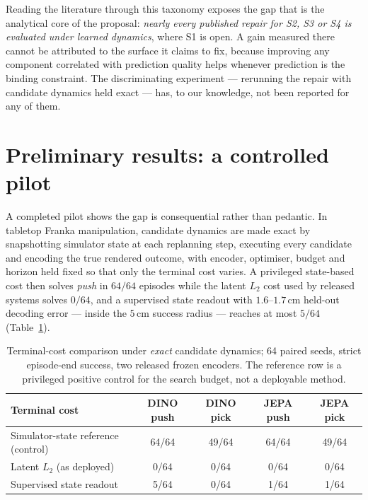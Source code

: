 \documentclass[11pt,letterpaper]{article}
\begin{document}
Reading the literature through this taxonomy exposes the gap that is the
analytical core of the proposal: \emph{nearly every published repair for S2, S3
or S4 is evaluated under learned dynamics}, where S1 is open. A gain measured
there cannot be attributed to the surface it claims to fix, because improving
any component correlated with prediction quality helps whenever prediction is
the binding constraint. The discriminating experiment --- rerunning the repair
with candidate dynamics held exact --- has, to our knowledge, not been reported
for any of them.

\section{Preliminary results: a controlled pilot}

A completed pilot shows the gap is consequential rather than pedantic. In
tabletop Franka manipulation, candidate dynamics are made exact by snapshotting
simulator state at each replanning step, executing every candidate and encoding
the true rendered outcome, with encoder, optimiser, budget and horizon held
fixed so that only the terminal cost varies. A privileged state-based cost then
solves \emph{push} in $64/64$ episodes while the latent $L_2$ cost used by
released systems solves $0/64$, and a supervised state readout with
$1.6$--$1.7$\,cm held-out decoding error --- inside the $5$\,cm success radius
--- reaches at most $5/64$ (Table~\ref{tab:pilot}).

\begin{table}[!ht]
\centering\small
\caption{Terminal-cost comparison under \emph{exact} candidate dynamics; 64
paired seeds, strict episode-end success, two released frozen encoders. The
reference row is a privileged positive control for the search budget, not a
deployable method.}\label{tab:pilot}
\begin{tabular}{@{}lcccc@{}}
\toprule
Terminal cost & DINO push & DINO pick & JEPA push & JEPA pick \\
\midrule
Simulator-state reference (control) & 64/64 & 49/64 & 64/64 & 49/64 \\
Latent $L_2$ (as deployed) & 0/64 & 0/64 & 0/64 & 0/64 \\
Supervised state readout & 5/64 & 0/64 & 1/64 & 1/64 \\
\bottomrule
\end{tabular}
\end{table}
\end{document}
